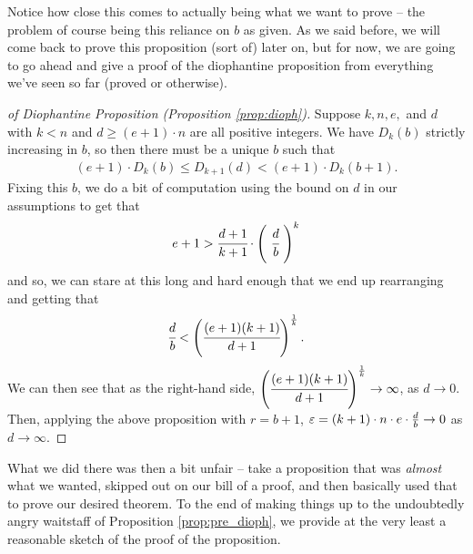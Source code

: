 Notice how close this comes to actually being what we want to prove -- the problem of course being this reliance on $b$ as given. As we said before, we will come back to prove this proposition (sort of) later on, but for now, we are going to go ahead and give a proof of the diophantine proposition from everything we've seen so far (proved or otherwise).


\begin{proof}[of Diophantine Proposition (Proposition \ref{prop:dioph})]
  Suppose $k, n, e, $ and $d$ with $k < n$ and $d \geq (e + 1) \cdot n$ are all positive integers. We have $D_k(b)$ strictly increasing in $b$, so then there must be a unique $b$ such that
    \begin{align*}
     (e + 1) \cdot D_k(b) \leq D_{k + 1}(d) < (e + 1) \cdot D_k(b + 1).
   \end{align*}
  Fixing this $b$, we do a bit of computation using the bound on $d$ in our assumptions to get that
    \begin{align*}
      e + 1 > \cfrac{d + 1}{k + 1} \cdot \left( \ \cfrac{d}{b} \ \right)^{k}
    \end{align*}
  and so, we can stare at this long and hard enough that we end up rearranging and getting that
    \begin{align*}
      \cfrac{d}{b} < \left( \cfrac{(e + 1)(k + 1)}{d + 1} \right)^{\frac{1}{k}}.
    \end{align*}
  We can then see that as the right-hand side, $\left( \cfrac{(e + 1)(k + 1)}{d + 1} \right)^{\frac{1}{k}} \to \infty$, as $d \to 0$. Then, applying the above proposition with $r = b+1$, $\varepsilon = (k+1) \cdot n \cdot e \cdot \frac{d}{b} \to 0$ as $d \to \infty$.
\end{proof}

What we did there was then a bit unfair -- take a proposition that was \emph{almost} what we wanted, skipped out on our bill of a proof, and then basically used that to prove our desired theorem. To the end of making things up to the undoubtedly angry waitstaff of Proposition \ref{prop:pre_dioph}, we provide at the very least a reasonable sketch of the proof of the proposition.

